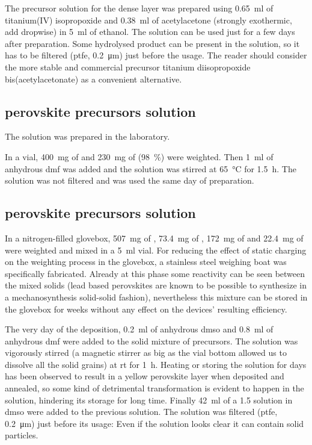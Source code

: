 		The precursor solution for the dense \TiOtwo layer was prepared using \SI{0.65}{\ml} of titanium(IV) isopropoxide and \SI{0.38}{\ml} of acetylacetone (strongly exothermic, add dropwise) in \SI{5}{\ml} of ethanol. The solution can be used just for a few days after preparation. Some hydrolysed product can be present in the solution, so it has to be filtered (\gls{ptfe}, \SI{0.2}{\um}) just before the usage. The reader should consider the more stable and commercial precursor titanium diisopropoxide bis(acetylacetonate) as a convenient alternative.

	\subsection{ perovskite precursors solution}\label{precursors_mapicl}

		The solution was prepared in the laboratory.

		In a vial, \SI{400}{\mg} of  and \SI{230}{\mg} of \PbCltwo (98~\%) were weighted. Then \SI{1}{\ml} of anhydrous \gls{dmf} was added and the solution was stirred at \SI{65}{\celsius} for \SI{1.5}{\hour}. The solution was not filtered and was used the same day of preparation.

	\subsection{ perovskite precursors solution}\label{precursors_csfamapbibr}

		In a nitrogen-filled glovebox, \SI{507}{\mg} of \PbItwo, \SI{73.4}{\mg} of \PbBrtwo, \SI{172}{\mg} of  and \SI{22.4}{\mg} of  were weighted and mixed in a \SI{5}{\ml} vial. For reducing the effect of static charging on the weighting process in the glovebox, a stainless steel weighing boat was specifically fabricated. Already at this phase some reactivity can be seen between the mixed solids (lead based perovskites are known to be possible to synthesize in a mechanosynthesis solid-solid fashion), nevertheless this mixture can be stored in the glovebox for weeks without any effect on the devices' resulting efficiency.

		The very day of the deposition, \SI{0.2}{\ml} of anhydrous \gls{dmso} and \SI{0.8}{\ml} of anhydrous \gls{dmf} were added to the solid mixture of precursors. The solution was vigorously stirred (a magnetic stirrer as big as the vial bottom allowed us to dissolve all the solid grains) at \gls{rt} for \SI{1}{\hour}. Heating or storing the solution for days has been observed to result in a yellow perovskite layer when deposited and annealed, so some kind of detrimental transformation is evident to happen in the solution, hindering its storage for long time. Finally \SI{42}{\ml} of
		a \SI{1.5}{\Molar} \CsI solution in \gls{dmso} were added to the previous solution. The solution was filtered (\gls{ptfe}, \SI{0.2}{\um}) just before its usage: Even if the solution looks clear it can contain solid particles.

